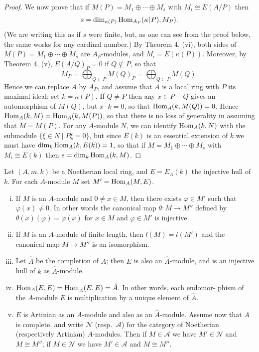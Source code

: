 \begin{proof}
We now prove that if $M(P) = M_1 \oplus \cdots \oplus M_s$ with $M_i \cong E(A/P)$ then
\[
  s = \dim_{\kappa(P)} \operatorname{Hom}_{A_P}(\kappa(P), M_P).
\]
(We are writing this as if $s$ were finite, but, as one can see from the proof
below, the same works for any cardinal number.) By Theorem 4, (vi), both
sides of $M(P) = M_1 \oplus \cdots \oplus M_s$ are $A_P$-modules, and $M_i = E(\kappa(P))$.
Moreover, by Theorem 4, (v), $E(A/Q)_P = 0$ if $Q \nsubseteq P$, so that
\[
  M_P = \bigoplus_{Q \subset P} M(Q)_P = \bigoplus_{Q \subset P} M(Q).
\]
Hence we can replace $A$ by $A_P$, and assume that $A$ is a local ring with $P$
its maximal ideal; set $k = \kappa(P)$. If $Q \neq P$ then any $x \in P - Q$ gives an
automorphism of $M(Q)$, but $x \cdot k = 0$, so that $\operatorname{Hom}_A(k, M(Q)) = 0$. Hence
$\operatorname{Hom}_A(k, M) = \operatorname{Hom}_A(k, M(P))$, so that there is no loss of generality in
assuming that $M = M(P)$. For any $A$-module $N$, we can identify
$\operatorname{Hom}_A(k, N)$ with the submodule $\{\xi \in N \mid P\xi = 0\}$, but since $E(k)$ is an
essential extension of $k$ we must have $\dim_k \operatorname{Hom}_A(k, E(k)) = 1$, so that if
$M = M_1 \oplus \cdots \oplus M_s$ with $M_i \cong E(k)$ then $s = \dim_k \operatorname{Hom}_A(k, M)$.
\end{proof}

\begin{theorem}\label{thm:18.6}
Let $(A, m, k)$ be a Noetherian local ring, and $E = E_A(k)$ the
injective hull of $k$. For each $A$-module $M$ set $M' = \operatorname{Hom}_A(M, E)$.
\begin{enumerate}[(i)]
  \item If $M$ is an $A$-module and $0 \neq x \in M$, then there exists $\varphi \in M'$ such that
        $\varphi(x) \neq 0$. In other words the canonical map $\theta\colon M \to M''$ defined by $\theta(x)(\varphi)
        = \varphi(x)$ for $x \in M$ and $\varphi \in M'$ is injective.
  \item If $M$ is an $A$-module of finite length, then $l(M) = l(M')$ and the
        canonical map $M \to M''$ is an isomorphism.
  \item Let $\hat{A}$ be the completion of $A$; then $E$ is also an $\hat{A}$-module, and
        is an injective hull of $k$ as $\hat{A}$-module.
  \item $\operatorname{Hom}_A(E, E) = \operatorname{Hom}_{\hat{A}}(E, E) = \hat{A}$. In other words, each endomor-
        phism of the $A$-module $E$ is multiplication by a unique element of $\hat{A}$.
  \item $E$ is Artinian as an $A$-module and also as an $\hat{A}$-module. Assume
        now that $A$ is complete, and write $\mathcal{N}$ (resp.\ $\mathcal{A}$) for the category of
        Noetherian (respectively Artinian) $A$-modules. Then if $M \in \mathcal{A}$ we have
        $M' \in \mathcal{N}$ and $M \cong M''$; if $M \in \mathcal{N}$ we have $M' \in \mathcal{A}$ and $M \cong M''$.
\end{enumerate}
\end{theorem}


